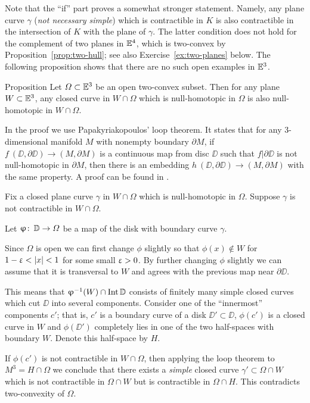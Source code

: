 Note that the ``if'' part proves a somewhat stronger statement.
Namely,  any plane curve $\gamma$ (\emph{not necessary simple}) which is  contractible in $K$ is also contractible in the intersection of $K$ with the plane of $\gamma$.
The latter condition does not hold for the complement 
of two planes in $\mathbb{E}^4$, which is two-convex by Proposition~\ref{prop:two-hull};
see also Exercise~\ref{ex:two-planes} below.
The following proposition shows that there are no such open examples in $\mathbb{E}^3$.

\begin{thm}{Proposition}\label{prop:3d-strong-2-convexity}
Let $\Omega\subset\EE^3$ be an open two-convex subset.
Then for any plane $W\subset\EE^3$, 
any closed curve in $W\cap \Omega$ 
which is null-homotopic in $\Omega$ is also null-homotopic in $W\cap \Omega$.
\end{thm}

In the proof we use Papakyriakopoulos' loop theorem.
It states that for any 3-dimensional manifold $M$ with nonempty boundary $\partial M$, if 
$f\: (\DD,\partial \DD)\to (M,\partial M)$
is a continuous map from disc $\DD$ such that $f|\partial \DD$ is not null-homotopic in $\partial M$, then there is an embedding 
$h\: (\DD,\partial \DD)\to (M,\partial M)$ 
with the same property.
A proof can be found in \cite{hatcher}.

Fix a closed plane curve $\gamma$ in $W\cap \Omega$ which is null-homotopic in $\Omega$. Suppose $\gamma$ is not contractible in  $W\cap \Omega$.

Let $\phi\co \DD\to\Omega$ be a map of the disk with boundary curve $\gamma$.

Since $\Omega$ is open we can first change  $\phi$  slightly so that $\phi(x)\notin W$ for $1-\eps<|x|<1$ for some small $\upvarepsilon>0$.
By further changing $\phi$ slightly we can assume that it is transversal to $W$ and agrees with the previous map near $\partial \DD$.


This means that $\phi^{-1} (W)\cap \Int \DD$ consists of finitely many simple closed curves which cut $\DD$ into several components. 
Consider one of the ``innermost'' components $c'$;
that is, $c'$ is a boundary curve of a disk $\DD'\subset \DD$,
$\phi(c')$ is a closed curve in $W$ and $\phi(\DD')$  completely lies in one of the two half-spaces  with boundary $W$. 
Denote this half-space by $H$.

If $\phi(c')$ is not contractible in $W\cap \Omega$,  then applying the loop theorem to $M^3=H\cap \Omega$ we conclude that  there exists a \emph{simple} closed curve $\gamma'\subset \Omega\cap W$ which is not contractible in $\Omega\cap W$ but is contractible in $\Omega\cap H$. 
This contradicts two-convexity of $\Omega$. 

